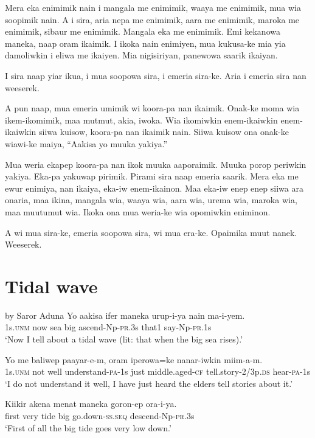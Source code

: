 Mera eka enimimik nain i mangala me enimimik, waaya me enimimik, mua wia soopimik nain. 
A i sira, aria nepa me enimimik, aara me enimimik, maroka me enimimik, sibaur me enimimik. 
Mangala eka me enimimik. 
Emi kekanowa maneka, naap oram ikaimik. 
I ikoka nain enimiyen, mua kukusa-ke mia yia damoliwkin i eliwa me ikaiyen. 
Mia nigisiriyan, panewowa saarik ikaiyan.

I sira naap yiar ikua, i mua soopowa sira, i emeria sira-ke. 
Aria i emeria sira nan weeserek.

A pun naap, mua emeria umimik wi koora-pa nan ikaimik. 
Onak-ke moma wia ikem-ikomimik, maa mutmut, akia, iwoka. 
Wia ikomiwkin enem-ikaiwkin enem-ikaiwkin siiwa kuisow, koora-pa nan ikaimik nain. 
Siiwa kuisow ona onak-ke wiawi-ke maiya, “Aakisa yo muuka yakiya.” 

Mua weria ekapep koora-pa nan ikok muuka aaporaimik. 
Muuka porop periwkin yakiya. 
Eka-pa yakuwap pirimik. 
Pirami sira naap emeria saarik. 
Mera eka me ewur enimiya, nan ikaiya, eka-iw enem-ikainon. 
Maa eka-iw enep enep siiwa ara onaria, maa ikina, mangala wia, waaya wia, aara wia, urema wia, maroka wia, maa muutumut wia.
Ikoka ona mua weria-ke wia opomiwkin eniminon. 

A wi mua sira-ke, emeria soopowa sira, wi mua era-ke. 
Opaimika muut nanek. 
Weeserek.

\section{Tidal wave}\label{app:2:wave}
by Saror Aduna
\ea
\gll  Yo  aakisa  ifer  maneka  urup-i-ya  nain  ma-i-yem. \\
1s.\textsc{unm}  now  sea  big  ascend-Np-\textsc{pr}.3s  that1  say-Np-\textsc{pr}.1s \\
\glt ‘Now I tell about a tidal wave (lit: that when the big sea rises).’ \\
\z


\ea
\gll  Yo  me  baliwep  paayar-e-m,  oram  iperowa=ke      nanar-iwkin  miim-a-m. \\
1s.\textsc{unm}  not  well  understand-\textsc{pa}-1s  just  middle.aged-\textsc{cf} tell.story-2/3p.\textsc{ds}  hear-\textsc{pa}-1s \\


\glt ‘I do not understand it well, I have just heard the elders tell stories about it.’ \\
\z


\ea
\gll  Kiikir  akena  menat  maneka  goron-ep  ora-i-ya. \\
first  very  tide  big  go.down-\textsc{ss.seq}  descend-Np-\textsc{pr}.3s \\
\glt ‘First of all the big tide goes very low down.’ \\
\z


